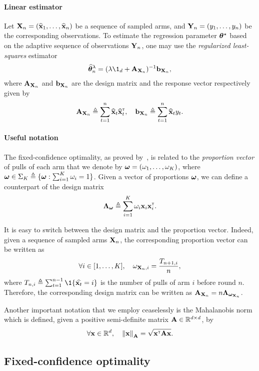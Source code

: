 \paragraph{Linear estimator}
Let ${\bf X}_n=(\widehat{{\bf x}}_1,\ldots,\widehat{{\bf x}}_n)$ be a sequence of sampled arms, and ${\bf Y}_n=(y_1,\ldots,y_n)$ be the corresponding observations. To estimate the regression parameter ${\boldsymbol \theta}^\star$ based on the adaptive sequence of observations ${\bf Y}_n$, one may use the \emph{regularized least-squares} estimator
\begin{align}\label{eq:update_mean}
    \hat{\btheta}_n^{\lambda} = (\lambda \1_d + \bA_{\bX_n})^{-1}\bb_{\bX_n},
\end{align}
where ${\bf A}_{{\bf X}_n}$ and ${\bf b}_{{\bf X}_n}$ are the design matrix and the response vector respectively given by
\[
    {\bf A}_{{\bf X}_n} \triangleq \sum_{t=1}^n \widehat{{\bf x}}_t\widehat{{\bf x}}_t^\mathsf{\scriptscriptstyle T}, \quad {\bf b}_{{\bf X}_n} \triangleq \sum_{t=1}^n \widehat{{\bf x}}_t y_t.
\]

\paragraph{Useful notation}
The fixed-confidence optimality, as proved by~\cite{garivier2016tracknstop,russo2016ttts}, is related to the \emph{proportion vector} of pulls of each arm that we denote by ${\boldsymbol \omega} = (\omega_1,\ldots,\omega_K)$, where ${\boldsymbol \omega}\in\Sigma_K \triangleq \{{\boldsymbol \omega} : \sum_{i=1}^K \omega_i = 1\}$. Given a vector of proportions ${\boldsymbol \omega}$, we can define a counterpart of the design matrix 
\[
    {\boldsymbol \Lambda}_{{\boldsymbol \omega}} \triangleq \sum_{i=1}^K \omega_i{\bf x}_i{\bf x}_i^\mathsf{\scriptscriptstyle T}.
\]

It is easy to switch between the design matrix and the proportion vector. Indeed, given a sequence of sampled arms ${\bf X}_n$, the corresponding proportion vector can be written as
\[
    \forall i\in [1,\ldots,K], \quad \omega_{{\bf X}_n,i} = \frac{T_{n+1,i}}{n},
\]
where $T_{n,i} \eqdef \sum_{t=1}^{n-1} \1\{\hat{\bx_t} = i\}$ is the number of pulls of arm $i$ before round $n$. Therefore, the corresponding design matrix can be written as ${\bf A}_{{\bf X}_n}=n{\boldsymbol \Lambda}_{{\boldsymbol \omega}_{{\bf X}_n}}$.

Another important notation that we employ ceaselessly is the Mahalanobis norm which is defined, given a positive semi-definite matrix ${\bf A}\in\mathbb{R}^{d\times d}$, by
\[
    \forall {\bf x}\in\mathbb{R}^d, \quad \left\lVert{\bf x}\right\rVert_{{\bf A}} = \sqrt{{\bf x}^\mathsf{\scriptscriptstyle T}{\bf A}{\bf x}}.
\]

\subsection{Fixed-confidence optimality}

